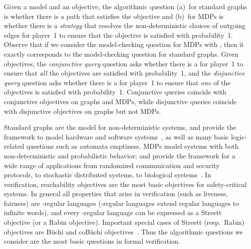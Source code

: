 \documentclass[11pt,letterpaper]{article}
\newif\iffullversion
\newcommand{\infull}[1]{\iffullversion #1\fi}
\newcommand{\inshort}[1]{\iffullversion \else #1\fi}
\begin{document}
\smallskip{}
\infull{The algorithmic question given a model and an objective is as follows: 
(a)~for standard graphs, the model-checking question asks whether there is a 
path that satisfies the objective; and 
(b)~for MDPs, the basic model-checking question asks 
}
\inshort{Given a model and an objective, the algorithmic question 
(a)~for standard graphs is whether there is a path that satisfies
the objective and (b)~for MDPs is}
whether there is a 
\infull{\emph{policy} (or a }\emph{strategy} that resolves the 
non-deterministic choices of outgoing 
edges\infull{)} for player~1 to ensure that the objective is satisfied with 
probability~1.
Observe that if we consider the model-checking question for MDPs with 
, then it exactly corresponds to the model-checking question 
for standard graphs.
Given  objectives, the \emph{conjunctive query} question asks whether
there is a \infull{policy} for player~1 to ensure that \emph{all}
the objectives 
are satisfied with probability~1, and the \emph{disjunctive query}
question asks whether there is a \infull{policy} for player~1 to ensure that \emph{one}
of the objectives is satisfied with probability~1.
Conjunctive queries coincide with conjunctive objectives on graphs and MDPs,
while disjunctive queries coincide with disjunctive objectives on graphs but not MDPs\infull{ (see 
Observations~\ref{obs:conj} and~\ref{obs:disjgraph})}.

\smallskip{} 
Standard graphs are the model for non-deterministic systems, and provide the 
framework to model hardware and software systems~\cite{SPIN,NUSMV}, as well
as many basic logic-related questions such as automata emptiness. 
MDPs model systems with both non-deterministic and probabilistic behavior; 
and provide the framework for a wide range of applications from randomized 
communication and security protocols, to stochastic distributed systems, 
to biological systems~\cite{prism,baierbook}.
In verification, reachability objectives are the most basic objectives for 
safety-critical systems.
In general all properties that arise in verification (such as liveness, 
fairness) are -regular languages (-regular languages extend 
regular languages to infinite words), and every -regular language can 
be expressed as a Streett objective (or a Rabin objective). Important special
cases of Streett (resp.\ Rabin) objectives are Büchi and coBüchi objectives~\cite{ChatterjeeH14}.
Thus the algorithmic questions we consider are the most basic questions in 
formal verification.
\end{document}
